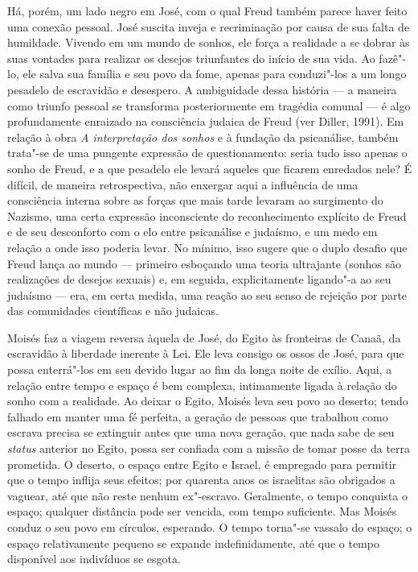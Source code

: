 Há, porém, um lado negro em José, com o qual Freud também parece haver
feito uma conexão pessoal. José suscita inveja e recriminação por causa
de sua falta de humildade. Vivendo em um mundo de sonhos, ele força a
realidade a se dobrar às suas vontades para realizar os desejos
triunfantes do início de sua vida. Ao fazê"-lo, ele salva sua família e
seu povo da fome, apenas para conduzi"-los a um longo pesadelo de
escravidão e desespero. A ambiguidade dessa história --- a maneira como
triunfo pessoal se transforma posteriormente em tragédia comunal --- é
algo profundamente enraizado na consciência judaica de Freud (ver
Diller, 1991). Em relação à obra \emph{A interpretação dos sonhos} e à
fundação da psicanálise, também trata"-se de uma pungente expressão de
questionamento: seria tudo isso apenas o sonho de Freud, e a que
pesadelo ele levará aqueles que ficarem enredados nele? É difícil, de
maneira retrospectiva, não enxergar aqui a influência de uma consciência
interna sobre as forças que mais tarde levaram ao surgimento do Nazismo,
uma certa expressão inconsciente do reconhecimento explícito de Freud e
de seu desconforto com o elo entre psicanálise e judaísmo, e um medo em
relação a onde isso poderia levar. No mínimo, isso sugere que o duplo
desafio que Freud lança ao mundo --- primeiro esboçando uma teoria
ultrajante (sonhos são realizações de desejos sexuais) e, em seguida,
explicitamente ligando"-a ao seu judaísmo --- era, em certa medida, uma
reação ao seu senso de rejeição por parte das comunidades científicas e
não judaicas.

Moisés faz a viagem reversa àquela de José, do Egito às fronteiras de
Canaã, da escravidão à liberdade inerente à Lei. Ele leva consigo os
ossos de José, para que possa enterrá"-los em seu devido lugar ao fim da
longa noite de exílio. Aqui, a relação entre tempo e espaço é bem
complexa, intimamente ligada à relação do sonho com a realidade. Ao
deixar o Egito, Moisés leva seu povo ao deserto; tendo falhado em manter
uma fé perfeita, a geração de pessoas que trabalhou como escrava precisa
se extinguir antes que uma nova geração, que nada sabe de seu
\emph{status} anterior no Egito, possa ser confiada com a missão de
tomar posse da terra prometida. O deserto, o espaço entre Egito e
Israel, é empregado para permitir que o tempo inflija seus efeitos; por
quarenta anos os israelitas são obrigados a vaguear, até que não reste
nenhum ex"-escravo. Geralmente, o tempo conquista o espaço; qualquer
distância pode ser vencida, com tempo suficiente. Mas Moisés conduz o
seu povo em círculos, esperando. O tempo torna"-se vassalo do espaço; o
espaço relativamente pequeno se expande indefinidamente, até que o tempo
disponível aos indivíduos se esgota.

